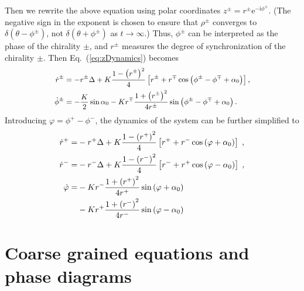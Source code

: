 \documentclass{article}
\begin{document}
Then we rewrite the above equation using polar coordinates $z^{\pm}=r^{\pm}\mathrm{e}^{-\mathrm{i}\phi ^{\pm}}$. (The negative sign in the exponent is chosen to ensure that $\rho^{\pm}$ converges to $\delta\left(\theta-\phi^{\pm}\right)$, not $\delta\left(\theta+\phi^{\pm}\right)$ as $t\rightarrow\infty$.) Thus, $\phi^{\pm}$ can be interpreted as the phase of the chirality $\pm$, and $r^{\pm}$ measures the degree of synchronization of the chirality $\pm$. 
Then Eq.~(\ref{eq:zDynamics}) becomes
\begin{subequations}
    \small
    \begin{align}
        \dot{r}^{\pm}&=-r^{\pm}\Delta +K\frac{1 -\left( r^{\pm} \right) ^2}{4}\left[ r^{\pm}+r^{\mp}\cos \left( \phi ^{\pm}-\phi ^{\mp}+\alpha _0 \right) \right] ,\\
        \dot{\phi}^{\pm}&=-\frac{K}{2}\sin \alpha _0-Kr^{\mp}\frac{1+\left( r^{\pm} \right) ^2}{4r^{\pm}}\sin \left( \phi ^{\pm}-\phi ^{\mp}+\alpha _0 \right) .
    \end{align}
\end{subequations}
Introducing $\varphi=\phi^+-\phi^-$, the dynamics of the system can be further simplified to
\begin{subequations}
    \begin{align}
        \dot{r}^+=&-r^+\Delta +K\frac{1-\left( r^+ \right) ^2}{4}\left[ r^++r^-\cos \left( \varphi +\alpha _0 \right) \right] \;,\\
        \dot{r}^-=&-r^-\Delta +K\frac{1-\left( r^- \right) ^2}{4}\left[ r^-+r^+\cos \left( \varphi -\alpha _0 \right) \right] \;,\\
        \dot{\varphi}=&-Kr^-\frac{1+\left( r^+ \right) ^2}{4r^+}\sin \left( \varphi +\alpha _0 \right)\notag\\
        &-Kr^+\frac{1+\left( r^- \right) ^2}{4r^-}\sin \left( \varphi -\alpha _0 \right)
    \end{align}
\end{subequations}

\color{black}

\section{\label{sec:analysis}Coarse grained equations and phase diagrams}
\end{document}
